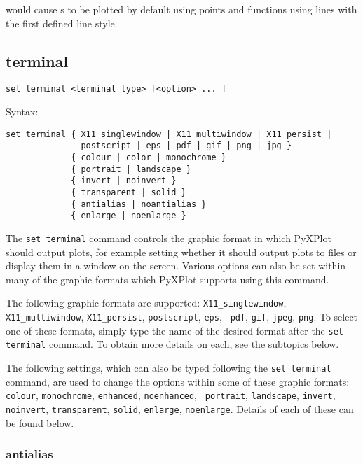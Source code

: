 \noindent would cause \datafile s to be plotted by default using points and
functions using lines with the first defined line style.
 
\subsection{terminal}

\begin{verbatim}
set terminal <terminal type> [<option> ... ]
\end{verbatim}

Syntax:

\begin{verbatim}
set terminal { X11_singlewindow | X11_multiwindow | X11_persist | 
               postscript | eps | pdf | gif | png | jpg } 
             { colour | color | monochrome } 
             { portrait | landscape } 
             { invert | noinvert } 
             { transparent | solid }
             { antialias | noantialias }
             { enlarge | noenlarge }
\end{verbatim}

The {\tt set terminal} command controls the graphic format in which PyXPlot
should output plots, for example setting whether it should output plots to files
or display them in a window on the screen. Various options can also be set
within many of the graphic formats which PyXPlot supports using this command.

The following graphic formats are supported:  {\tt X11\_singlewindow},
\newline\noindent %
{\tt X11\_multiwindow}, {\tt X11\_persist}, {\tt postscript}, {\tt eps}, {\tt
pdf}, {\tt gif}, {\tt jpeg}, {\tt png}. To select one of these formats, simply
type the name of the desired format after the {\tt set terminal} command. To
obtain more details on each, see the subtopics below.

The following settings, which can also be typed following the {\tt set terminal}
command, are used to change the options within some of these graphic formats:
{\tt colour}, {\tt monochrome}, {\tt enhanced}, {\tt noenhanced}, {\tt
portrait}, {\tt landscape}, {\tt invert}, {\tt noinvert}, {\tt transparent},
{\tt solid}, {\tt enlarge}, {\tt noenlarge}. Details of each of these can be
found below.

\subsubsection{antialias}

